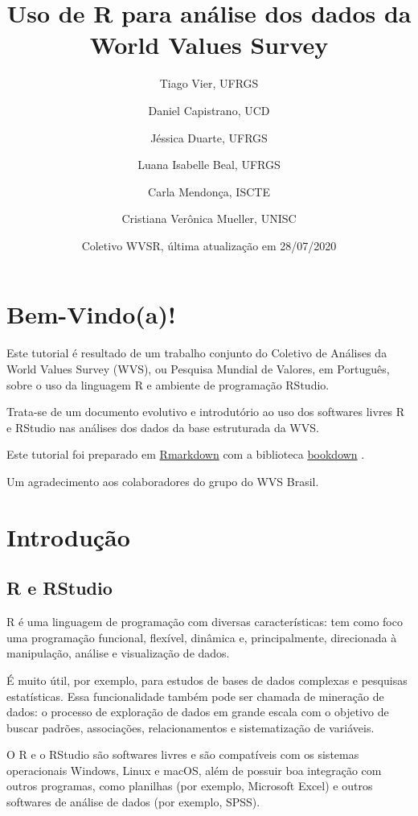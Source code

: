 \documentclass[
  10pt,
  brazil,
  a4paper,
  twoside, notitlepage, openright]{book}
\title{Uso de R para análise dos dados da World Values Survey}
\author{Tiago Vier, UFRGS \and Daniel Capistrano, UCD \and Jéssica Duarte, UFRGS \and Luana Isabelle Beal, UFRGS \and Carla Mendonça, ISCTE \and Cristiana Verônica Mueller, UNISC}
\date{Coletivo WVSR, última atualização em 28/07/2020}
\begin{document}
\maketitle

{
\setcounter{tocdepth}{1}
\tableofcontents
}
\hypertarget{bem-vindoa}{%
\chapter*{Bem-Vindo(a)!}\label{bem-vindoa}}

Este tutorial é resultado de um trabalho conjunto do Coletivo de Análises da World Values Survey (WVS), ou Pesquisa Mundial de Valores, em Português, sobre o uso da linguagem R e ambiente de programação RStudio.

Trata-se de um documento evolutivo e introdutório ao uso dos softwares livres R e RStudio nas análises dos dados da base estruturada da WVS.

Este tutorial foi preparado em \href{https://rmarkdown.rstudio.com/}{Rmarkdown} \citeyearpar{R-rmarkdown} com a biblioteca \href{https://bookdown.org/}{bookdown} \citeyearpar{R-bookdown}.

Um agradecimento aos colaboradores do grupo do WVS Brasil.

\hypertarget{intro}{%
\chapter{Introdução}\label{intro}}

\hypertarget{r-e-rstudio}{%
\section{R e RStudio}\label{r-e-rstudio}}

R é uma linguagem de programação com diversas características: tem como foco uma programação funcional, flexível, dinâmica e, principalmente, direcionada à manipulação, análise e visualização de dados.

É muito útil, por exemplo, para estudos de bases de dados complexas e pesquisas estatísticas. Essa funcionalidade também pode ser chamada de mineração de dados: o processo de exploração de dados em grande escala com o objetivo de buscar padrões, associações, relacionamentos e sistematização de variáveis.

O R e o RStudio são softwares livres e são compatíveis com os sistemas operacionais Windows, Linux e macOS, além de possuir boa integração com outros programas, como planilhas (por exemplo, Microsoft Excel) e outros softwares de análise de dados (por exemplo, SPSS).
\end{document}
